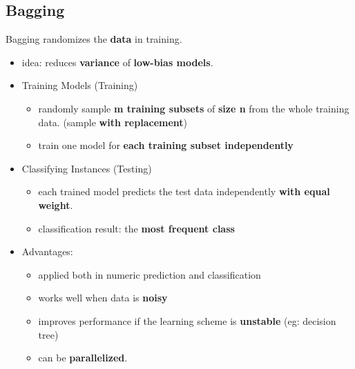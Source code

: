 \subsection{Bagging}
Bagging randomizes the \textbf{data} in training.
\begin{itemize}
	\item idea: reduces \textbf{variance} of \textbf{low-bias models}.
	\item Training Models (Training)
	\begin{itemize}
		\item randomly sample \textbf{m training subsets} of \textbf{size n} from the whole training data. (sample \textbf{with replacement}) 
		\item train one model for \textbf{each training subset independently} 
	\end{itemize}
	
	\item Classifying Instances (Testing)
	\begin{itemize}
		\item each trained model predicts the test data independently \textbf{with equal weight}.
		\item classification result: the \textbf{most frequent class}
	\end{itemize}
	\item Advantages:
	\begin{itemize}
		\item applied both in numeric prediction and classification
		\item works well when data is \textbf{noisy}
		\item improves performance if the learning scheme is \textbf{unstable} (eg: decision tree)
		\item can be \textbf{parallelized}.
	\end{itemize}
\end{itemize}
